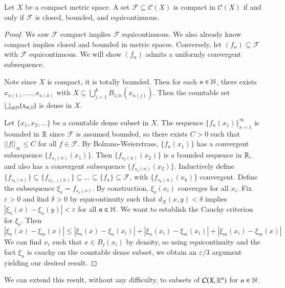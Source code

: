 \begin{namthm}
    Let $X$ be a compact metric space. A set $\mathcal{F} \subseteq \mathcal{C}(X)$ is compact in $\mathcal{C}(X)$ if and only if $\mathcal{F}$ is closed, bounded, and equicontinuous.
\end{namthm}
\begin{proof}
    We saw $\mathcal{F}$ compact implies $\mathcal{F}$ equicontinuous. We also already know compact implies closed and bounded in metric spaces. Conversely, let $(f_n) \subseteq \mathcal{F}$ with $\mathcal{F}$ equicontinuous. We will show $(f_n)$ admits a uniformly convergent subsequence.

    Note since $X$ is compact, it is totally bounded. Then for each $n \in \mathbb N$, there exists $x_{n(1)},...,x_{n(k)}$ with $X \subseteq \bigcup_{j=1}^kB_{1/n}(x_{n(j)})$. Then the countable set $\bigcup_{n\in\mathbb N}\{x_{n(j)}\}$ is dense in $X$.

    Let $\{x_1,x_2,...\}$ be a countable dense subset in $X$. The sequence $\{f_n(x_1)\}_{n=1}^{\infty}$ is bounded in $\mathbb R$ since $\mathcal{F}$ is assumed bounded, so there exists $C > 0$ such that $||f||_{\infty} \leq C$ for all $f \in \mathcal{F}$. By Bolzano-Weierstrass, $\{f_n(x_1)\}$ has a convergent subsequence $\{f_{s_1(n)}(x_1)\}$. Then $\{f_{s_2(n)}(x_2)\}$ is a bounded sequence in $\mathbb R$, and also has a convergent subsequence $\{f_{s_2(n)}(x_2)\}$. Inductively define $\{f_{s_k(n)}\}\subseteq \{f_{s_{k-1}(n)}\} \subseteq ... \subseteq \{f_n\}\subseteq \mathcal{F}$, with $\{f_{s_k(n)}(x_k)\}$ convergent. Define the subsequence $\xi_{\nu} = f_{s_{\nu}(\nu)}$. By construction, $\xi_{\nu}(x_i)$ converges for all $x_i$. Fix $\varepsilon > 0$ and find $\delta > 0$ by equicontinuity such that $d_X(x,y) < \delta$ implies $|\xi_n(x) - \xi_n(y)| < \varepsilon$ for all $n \in \mathbb N$. We want to establish the Cauchy criterion for $\xi_{\nu}$. Then $$|\xi_n(x) - \xi_m(x)| \leq |\xi_n(x) - \xi_n(x_i)| + |\xi_n(x_i) - \xi_m(x_i)| + |\xi_m(x_i) - \xi_m(x)|$$ We can find $x_i$ such that $x \in B_j(x_i)$ by density, so using equicontinuity and the fact $\xi_n$ is cauchy on the countable dense subset, we obtain an $\varepsilon/3$ argument yielding our desired result.
\end{proof}

We can extend this result, without any difficulty, to subsets of $\mathcal{C}(X,\mathbb R^n)$ for $n \in \mathbb N$.

